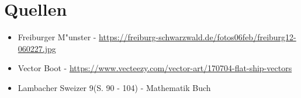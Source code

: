 \documentclass{standalone}
\begin{document}
\section{Quellen}
\begin{itemize}
  \item Freiburger M{"u}nster - \url{https://freiburg-schwarzwald.de/fotos06feb/freiburg12-060227.jpg}
  \item Vector Boot - \url{https://www.vecteezy.com/vector-art/170704-flat-ship-vectors}
  \item Lambacher Sweizer 9(S. 90 - 104) - Mathematik Buch
\end{itemize}
\end{document}
